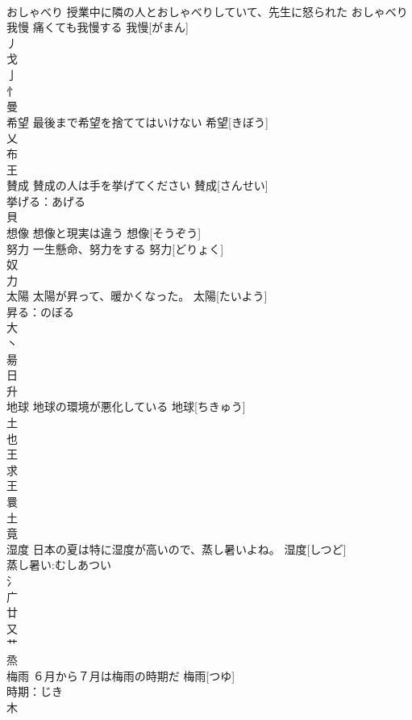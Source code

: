 \documentclass[8pt]{extreport}
\begin{document}
\begin{CJK}{UTF8}{min}
\\	おしゃべり	授業中に隣の人とおしゃべりしていて、先生に怒られた	おしゃべり			
\\	我慢	痛くても我慢する	我慢[がまん]			
\\	丿 
\\	戈 
\\	亅 
\\	忄 
\\	曼 
\\	希望	最後まで希望を捨ててはいけない	希望[きぼう]			
\\	乂 
\\	布 
\\	王 
\\	賛成	賛成の人は手を挙げてください	賛成[さんせい]			
\\	挙げる：あげる
\\	貝 
\\	想像	想像と現実は違う	想像[そうぞう]			
\\	努力	一生懸命、努力をする	努力[どりょく]			
\\	奴 
\\	力 
\\	太陽	太陽が昇って、暖かくなった。	太陽[たいよう]			
\\	昇る：のぼる
\\	大 
\\	丶 
\\	昜 
\\	日 
\\	升 
\\	地球	地球の環境が悪化している	地球[ちきゅう]			
\\	土 
\\	也 
\\	王 
\\	求 
\\	王 
\\	睘 
\\	土 
\\	竟 
\\	湿度	日本の夏は特に湿度が高いので、蒸し暑いよね。	湿度[しつど]			
\\	蒸し暑い:むしあつい
\\	氵 
\\	广 
\\	廿 
\\	又 
\\	艹 
\\	烝 
\\	梅雨	６月から７月は梅雨の時期だ	梅雨[つゆ]			
\\	時期：じき
\\	木 

\end{CJK}
\end{document}
